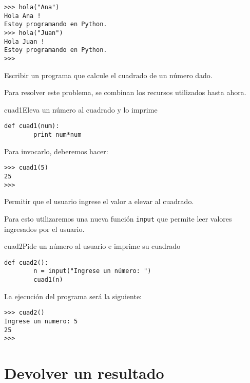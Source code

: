 \begin{lstlisting}[numbers=none]
>>> hola("Ana")
Hola Ana !
Estoy programando en Python.
>>> hola("Juan")
Hola Juan !
Estoy programando en Python.
>>>
\end{lstlisting}

\begin{problema}
\label{cuad1}
Escribir un programa que calcule el cuadrado de un número dado.
\end{problema}

\begin{solucion}
Para resolver este problema, se combinan los recursos utilizados hasta ahora.

\begin{codigo}{cuad1}{Eleva un número al cuadrado y lo imprime}
\begin{lstlisting}[numbers=none]
def cuad1(num):
        print num*num
\end{lstlisting}
\end{codigo}

Para invocarlo, deberemos hacer:
\begin{lstlisting}[numbers=none]
>>> cuad1(5)
25
>>>
\end{lstlisting}
\end{solucion}

\begin{problema}
Permitir que el usuario ingrese el valor a elevar al cuadrado.
\end{problema}

\begin{solucion}
Para esto utilizaremos una nueva función \lstinline+input+ que permite leer valores
ingresados por el usuario.

\begin{codigo}{cuad2}{Pide un número al usuario e imprime su cuadrado}
\begin{lstlisting}[numbers=none]
def cuad2():
        n = input("Ingrese un número: ")
        cuad1(n)
\end{lstlisting}
\end{codigo}

La ejecución del programa será la siguiente:

\begin{lstlisting}[numbers=none]
>>> cuad2()
Ingrese un numero: 5
25
>>>
\end{lstlisting}
\end{solucion}

\section{Devolver un resultado}


